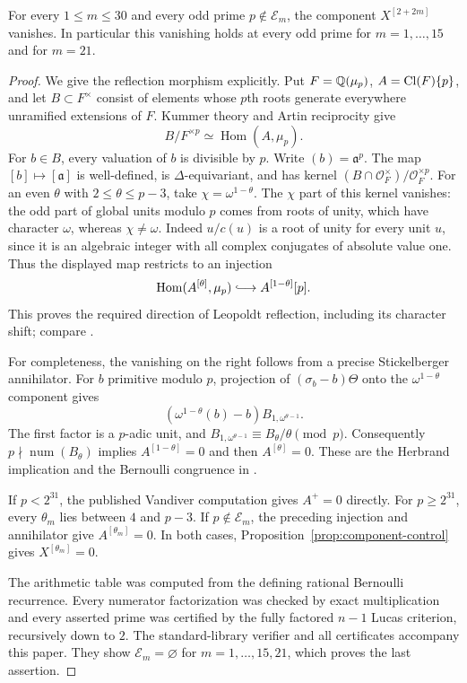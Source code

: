 \begin{proposition}\label{prop:reflection-exceptions}
For every $1\leq m\leq30$ and every odd prime
$p\notin\mathcal E_m$, the component $X^{[2+2m]}$ vanishes.
In particular this vanishing holds at every odd prime for
$m=1,\ldots,15$ and for $m=21$.
\end{proposition}
\begin{proof}
We give the reflection morphism explicitly. Put $F=\mathbb Q(\mu_p)$,
$A=\operatorname{Cl}(F)\{p\}$, and let $B\subset F^\times$ consist of elements
whose $p$th roots generate everywhere unramified extensions of $F$.
Kummer theory and Artin reciprocity give
\[
 B/F^{\times p}\simeq\operatorname{Hom}(A,\mu_p).
\]
For $b\in B$, every valuation of $b$ is divisible by $p$.
Write $(b)=\mathfrak a^p$. The map $[b]\mapsto[\mathfrak a]$
is well-defined, is $\Delta$-equivariant, and has kernel
$(B\cap\mathcal O_F^\times)/\mathcal O_F^{\times p}$.
For an even $\theta$ with $2\leq\theta\leq p-3$, take
$\chi=\omega^{1-\theta}$. The $\chi$ part of this kernel vanishes:
the odd part of global units modulo $p$ comes from roots of unity,
which have character $\omega$, whereas $\chi\ne\omega$.
Indeed $u/c(u)$ is a root of unity for every unit $u$, since it is
an algebraic integer with all complex conjugates of absolute value one.
Thus the displayed map restricts to an injection
\[
 \operatorname{Hom}(A^{[\theta]},\mu_p)
       \lhook\joinrel\longrightarrow A^{[1-\theta]}[p].
\]
This proves the required direction of Leopoldt reflection, including
its character shift; compare \cite[Theorem~4.4.2 and
Corollary~4.4.4]{SharifiIwa}.

For completeness, the vanishing on the right follows from a precise
Stickelberger annihilator. For $b$ primitive modulo $p$, projection
of $(\sigma_b-b)\Theta$ onto the $\omega^{1-\theta}$ component gives
\[
 (\omega^{1-\theta}(b)-b)B_{1,\omega^{\theta-1}}.
\]
The first factor is a $p$-adic unit, and
$B_{1,\omega^{\theta-1}}\equiv B_\theta/\theta\pmod p$.
Consequently $p\nmid\operatorname{num}(B_\theta)$ implies
$A^{[1-\theta]}=0$ and then $A^{[\theta]}=0$.
These are the Herbrand implication and the Bernoulli congruence in
\cite[Theorem~4.5.7 and Corollary~5.4.15]{SharifiIwa}.

If $p<2^{31}$, the published Vandiver computation
\cite[\S1, assertion~(2)]{HHO} gives $A^+=0$ directly.
For $p\geq2^{31}$, every $\theta_m$ lies between $4$ and $p-3$.
If $p\notin\mathcal E_m$, the preceding injection and annihilator
give $A^{[\theta_m]}=0$. In both cases,
Proposition~\ref{prop:component-control} gives $X^{[\theta_m]}=0$.

The arithmetic table was computed from the defining rational
Bernoulli recurrence. Every numerator factorization was checked
by exact multiplication and every asserted prime was certified
by the fully factored $n-1$ Lucas criterion, recursively down to $2$.
The standard-library verifier and all certificates accompany this paper.
They show $\mathcal E_m=\varnothing$ for $m=1,\ldots,15,21$,
which proves the last assertion.
\end{proof}

